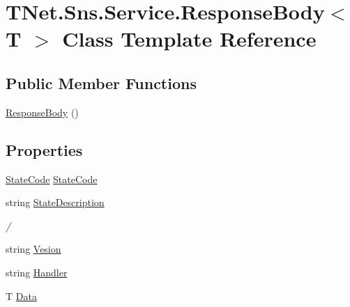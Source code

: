 \hypertarget{class_t_net_1_1_sns_1_1_service_1_1_response_body}{}\section{T\+Net.\+Sns.\+Service.\+Response\+Body$<$ T $>$ Class Template Reference}
\label{class_t_net_1_1_sns_1_1_service_1_1_response_body}


 


\subsection*{Public Member Functions}
\begin{DoxyCompactItemize}
\item 
\mbox{\hyperlink{class_t_net_1_1_sns_1_1_service_1_1_response_body_a9d0a98a2e773141b2687e29b3596b5d0}{Response\+Body}} ()
\end{DoxyCompactItemize}
\subsection*{Properties}
\begin{DoxyCompactItemize}
\item 
\mbox{\hyperlink{namespace_t_net_1_1_sns_1_1_service_ab93c34900ebc0ee83129c9ccab1e4bd8}{State\+Code}} \mbox{\hyperlink{class_t_net_1_1_sns_1_1_service_1_1_response_body_a4cb61b108d48f94dae6a50ebdb23cc46}{State\+Code}}
\item 
string \mbox{\hyperlink{class_t_net_1_1_sns_1_1_service_1_1_response_body_a069002c70fb3929961769b3b587ec713}{State\+Description}}
\begin{DoxyCompactList}\small\item\em / \end{DoxyCompactList}\item 
string \mbox{\hyperlink{class_t_net_1_1_sns_1_1_service_1_1_response_body_a39bb2d0a25b465dcd7632b677a26d7d2}{Vesion}}
\item 
string \mbox{\hyperlink{class_t_net_1_1_sns_1_1_service_1_1_response_body_af6cc0aaf904030d18cff14012215199e}{Handler}}
\item 
T \mbox{\hyperlink{class_t_net_1_1_sns_1_1_service_1_1_response_body_af758edb4d24f72836241a8b622254c64}{Data}}
\end{DoxyCompactItemize}


